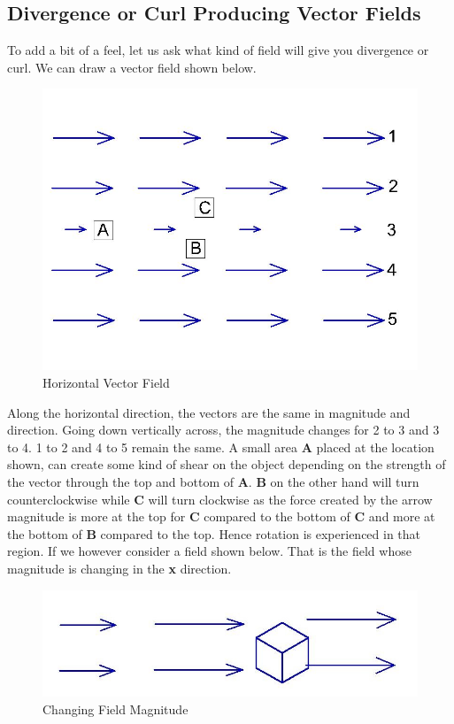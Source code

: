 \subsection{Divergence or Curl Producing Vector Fields}
To add a bit of a feel, let us ask what kind of field will give you divergence or curl. We can draw a vector field shown below.
\begin{figure}[ht]
\centering
\includegraphics[width=1\linewidth]{graphics/fig171}
\caption{Horizontal Vector Field}
\end{figure}

Along the horizontal direction, the vectors are the same in magnitude and direction. Going down vertically across, the magnitude changes for 2 to 3 and 3 to 4. 1 to 2 and 4 to 5 remain the same. A small area \textbf{A} placed at the location shown, can create some kind of shear on the object depending on the strength of the vector through the top and bottom of \textbf{A}. \textbf{B} on the other hand will turn counterclockwise while \textbf{C} will turn clockwise as the force created by the arrow magnitude is more at the top for \textbf{C} compared to the bottom of \textbf{C} and more at the bottom of \textbf{B} compared to the top. Hence rotation is experienced in that region. If we however consider a field shown below. That is the field whose magnitude is changing in the \textbf{x} direction.
\begin{figure}[ht]
\centering
\includegraphics[width=1\linewidth]{graphics/fig172}
\caption{Changing Field Magnitude}
\end{figure}

